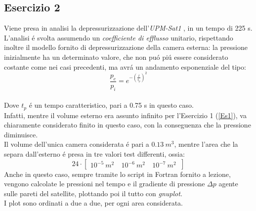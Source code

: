 \documentclass{article}
\begin{document}
        \subsection{Esercizio 2}

        Viene presa in analisi la depressurizzazione dell'\textit{UPM-Sat1} 
        \autocite*{UPM_sat1}, in un tempo di 225 s. \\ 
        L'analisi é svolta assumendo un \textit{coefficiente di efflusso} unitario,
        rispettando inoltre il modello fornito di depressurizzazione della camera esterna: la pressione
        inizialmente ha un determinato valore, che non puó piú essere considerato costante come nei casi precedenti, ma avrá un andamento 
        esponenziale del tipo: \\
        \begin{equation}
            \frac{p_e}{p_i} = e^{-\left ({\frac{t}{t_p}}  \right )^2}
        \end{equation}
        \\ 
        Dove $t_p$ é un tempo caratteristico, pari a 0.75 s in questo caso.
        \\ 
        \linebreak
        Infatti, mentre il volume esterno era assunto infinito per l'Esercizio 1 (\ref{Es1}), va chiaramente considerato
        finito in questo caso, con la conseguenza che la pressione diminuisce.
        \\ 
        \linebreak
        Il volume dell'unica camera considerata é pari a $0.13 \ m^3$, mentre 
        l'area che la separa dall'esterno é presa in tre valori test differenti, ossia:
        \[24 \cdot \begin{bmatrix}
            10^{-5}\ m^2\ & 10^{-6}\ m^2\ & 10^{-7} \ m^2\
            \end{bmatrix}\]
        \linebreak
        Anche in questo caso, sempre tramite lo script in Fortran fornito a lezione, 
        vengono calcolate le pressioni nel tempo e il gradiente di pressione $\Delta p$ agente sulle pareti
        del satellite, plottando poi il tutto con \textit{gnuplot}.\\ 
        I plot sono ordinati a due a due, per ogni area considerata.
        \pagebreak
        
\end{document}
